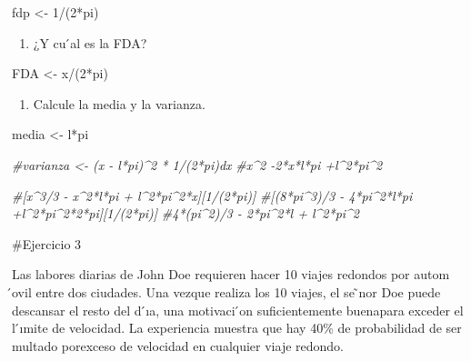 \documentclass[
]{article}
\newenvironment{Shaded}{\begin{snugshade}}{\end{snugshade}}
\newcommand{\CommentTok}[1]{\textcolor[rgb]{0.56,0.35,0.01}{\textit{#1}}}
\newcommand{\DecValTok}[1]{\textcolor[rgb]{0.00,0.00,0.81}{#1}}
\newcommand{\NormalTok}[1]{#1}
\newcommand{\OtherTok}[1]{\textcolor[rgb]{0.56,0.35,0.01}{#1}}
\newcommand{\SpecialCharTok}[1]{\textcolor[rgb]{0.00,0.00,0.00}{#1}}
\providecommand{\tightlist}{%
  \setlength{\itemsep}{0pt}\setlength{\parskip}{0pt}}
\begin{document}
\begin{Shaded}
\begin{Highlighting}[]
\NormalTok{fdp }\OtherTok{\textless{}{-}} \DecValTok{1}\SpecialCharTok{/}\NormalTok{(}\DecValTok{2}\SpecialCharTok{*}\NormalTok{pi)}
\end{Highlighting}
\end{Shaded}

\begin{enumerate}
\def\labelenumi{\alph{enumi})}
\setcounter{enumi}{2}
\tightlist
\item
  ¿Y cu ́al es la FDA?
\end{enumerate}

\begin{Shaded}
\begin{Highlighting}[]
\NormalTok{FDA }\OtherTok{\textless{}{-}}\NormalTok{ x}\SpecialCharTok{/}\NormalTok{(}\DecValTok{2}\SpecialCharTok{*}\NormalTok{pi)}
\end{Highlighting}
\end{Shaded}

\begin{enumerate}
\def\labelenumi{\alph{enumi})}
\setcounter{enumi}{3}
\tightlist
\item
  Calcule la media y la varianza.
\end{enumerate}

\begin{Shaded}
\begin{Highlighting}[]
\NormalTok{media }\OtherTok{\textless{}{-}}\NormalTok{ l}\SpecialCharTok{*}\NormalTok{pi}

\CommentTok{\#varianza \textless{}{-} (x {-} l*pi)\^{}2 * 1/(2*pi)dx}
\CommentTok{\#x\^{}2 {-}2*x*l*pi +l\^{}2*pi\^{}2}

\CommentTok{\#[x\^{}3/3 {-} x\^{}2*l*pi + l\^{}2*pi\^{}2*x][1/(2*pi)]}
\CommentTok{\#[(8*pi\^{}3)/3 {-} 4*pi\^{}2*l*pi +l\^{}2*pi\^{}2*2*pi][1/(2*pi)]}
\CommentTok{\#4*(pi\^{}2)/3 {-} 2*pi\^{}2*l + l\^{}2*pi\^{}2}
\end{Highlighting}
\end{Shaded}

\#Ejercicio 3

Las labores diarias de John Doe requieren hacer 10 viajes redondos por
autom ́ovil entre dos ciudades. Una vezque realiza los 10 viajes, el se
̃nor Doe puede descansar el resto del d ́ıa, una motivaci ́on
suficientemente buenapara exceder el l ́ımite de velocidad. La
experiencia muestra que hay 40\% de probabilidad de ser multado
porexceso de velocidad en cualquier viaje redondo.
\end{document}
